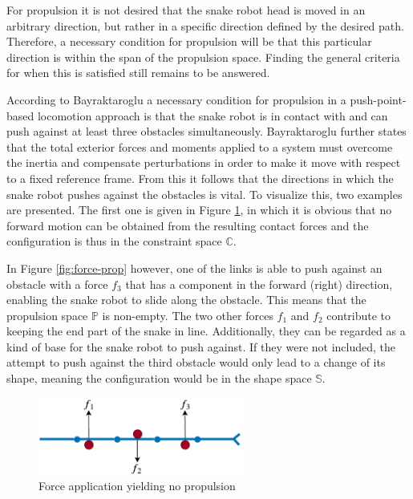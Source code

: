 For propulsion it is not desired that the snake robot head is moved in an arbitrary direction, but rather in a specific direction defined by the desired path. Therefore, a necessary condition for propulsion will be that this particular direction is within the span of the propulsion space. Finding the general criteria for when this is satisfied still remains to be answered.

According to Bayraktaroglu \cite{bayraktaroglu2004understanding} a necessary condition for propulsion in a push-point-based locomotion approach is that the snake robot is in contact with and can push against at least three obstacles simultaneously. Bayraktaroglu \cite{bayraktaroglu2004understanding} further states that the total exterior forces and moments applied to a system must overcome the inertia and compensate perturbations in order to make it move with respect to a fixed reference frame. From this it follows that the directions in which the snake robot pushes against the obstacles is vital. To visualize this, two examples are presented. The first one is given in Figure \ref{fig:force-noprop}, in which it is obvious that no forward motion can be obtained from the resulting contact forces and the configuration is thus in the constraint space $\mathbb{C}$.

In Figure \ref{fig:force-prop} however, one of the links is able to push against an obstacle with a force $f_3$ that has a component in the forward (right) direction, enabling the snake robot to slide along the obstacle. This means that the propulsion space $\mathbb{P}$ is non-empty. The two other forces $f_1$ and $f_2$ contribute to keeping the end part of the snake in line. Additionally, they can be regarded as a kind of base for the snake robot to push against. If they were not included, the attempt to push against the third obstacle would only lead to a change of its shape, meaning the configuration would be in the shape space $\mathbb{S}$. 

\begin{figure}
    \centering
    \includegraphics[width=0.6\textwidth]{figures/theory/obst-push-noprop.pdf}
    \caption{Force application yielding no propulsion}
    \label{fig:force-noprop}
\end{figure}

